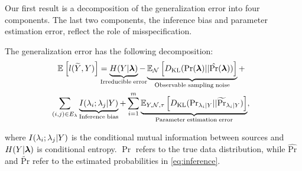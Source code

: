 

Our first result is a decomposition of the generalization error into four components. The last two components, the inference bias and parameter estimation error, reflect the role of misspecification.
\begin{theorem}
The generalization error has the following decomposition:
\begin{align}
    &\E{}{l(\widetilde{Y}, Y)} = \underbrace{H(Y | \bm{\lf})}_{\mathclap{\mathrm{Irreducible \; error}}} - \underbrace{\E{\N}{\KL(\Pr(\bm{\lf}) || \hat{\Pr}(\bm{\lf}))}}_{\mathrm{Observable \; sampling \; noise}} + \nonumber \\ %
    &\sum_{\mathclap{(i, j) \in E_{\lf}}} \;\;\; \underbrace{I(\lf_i; \lf_j | Y)}_{\mathrm{Inference \; bias}} +  \sum_{i = 1}^m \underbrace{\E{Y, \N, \tau}{\KL(\mathrm{Pr}_{\lf_i | Y} || \widetilde{\Pr}_{\lf_i | Y })}}_{\mathrm{Parameter \;estimation \;error}} \nonumber,
\end{align}

where $I(\lambda_i; \lambda_j | Y)$ is the conditional mutual information between sources and $H(Y|\bm{\lambda})$ is conditional entropy. $\Pr$ refers to the true data distribution, while $\hat{\mathrm{Pr}}$ and $\widetilde{\mathrm{Pr}}$ refer to the estimated probabilities in \eqref{eq:inference}.

\label{thm:decomposition}
\end{theorem}

